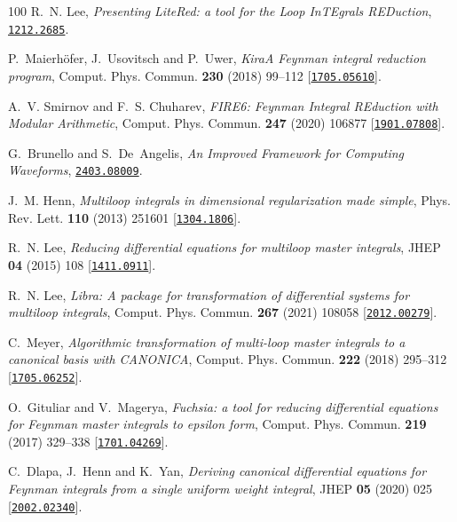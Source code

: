 \begin{thebibliography}{100}
R.~N. Lee,  {\em {Presenting LiteRed: a tool for the Loop InTEgrals
  REDuction}}, \href{http://www.arXiv.org/abs/1212.2685}{{\tt 1212.2685}}.

P.~Maierh\"ofer, J.~Usovitsch and P.~Uwer,  {\em {Kira\textemdash{}A Feynman
  integral reduction program}}, Comput. Phys. Commun. {\bf 230} (2018) 99--112
  [\href{http://www.arXiv.org/abs/1705.05610}{{\tt 1705.05610}}].

A.~V. Smirnov and F.~S. Chuharev,  {\em {FIRE6: Feynman Integral REduction with
  Modular Arithmetic}}, Comput. Phys. Commun. {\bf 247} (2020) 106877
  [\href{http://www.arXiv.org/abs/1901.07808}{{\tt 1901.07808}}].

G.~Brunello and S.~De~Angelis,  {\em {An Improved Framework for Computing
  Waveforms}}, \href{http://www.arXiv.org/abs/2403.08009}{{\tt 2403.08009}}.

J.~M. Henn,  {\em {Multiloop integrals in dimensional regularization made
  simple}}, Phys. Rev. Lett. {\bf 110} (2013) 251601
  [\href{http://www.arXiv.org/abs/1304.1806}{{\tt 1304.1806}}].

R.~N. Lee,  {\em {Reducing differential equations for multiloop master
  integrals}}, JHEP {\bf 04} (2015) 108
  [\href{http://www.arXiv.org/abs/1411.0911}{{\tt 1411.0911}}].

R.~N. Lee,  {\em {Libra: A package for transformation of differential systems
  for multiloop integrals}}, Comput. Phys. Commun. {\bf 267} (2021) 108058
  [\href{http://www.arXiv.org/abs/2012.00279}{{\tt 2012.00279}}].

C.~Meyer,  {\em {Algorithmic transformation of multi-loop master integrals to a
  canonical basis with CANONICA}}, Comput. Phys. Commun. {\bf 222} (2018)
  295--312 [\href{http://www.arXiv.org/abs/1705.06252}{{\tt 1705.06252}}].

O.~Gituliar and V.~Magerya,  {\em {Fuchsia: a tool for reducing differential
  equations for Feynman master integrals to epsilon form}}, Comput. Phys.
  Commun. {\bf 219} (2017) 329--338
  [\href{http://www.arXiv.org/abs/1701.04269}{{\tt 1701.04269}}].

C.~Dlapa, J.~Henn and K.~Yan,  {\em {Deriving canonical differential equations
  for Feynman integrals from a single uniform weight integral}}, JHEP {\bf 05}
  (2020) 025 [\href{http://www.arXiv.org/abs/2002.02340}{{\tt 2002.02340}}].


\end{thebibliography}
